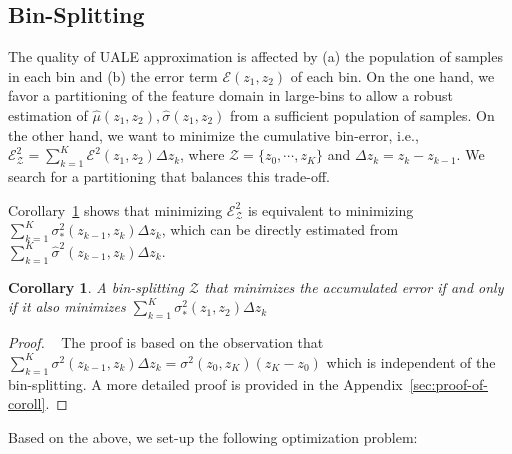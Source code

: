 \documentclass[twoside]{article}
\newtheorem{corollary}{Corollary}[theorem]
\begin{document}
\subsection{Bin-Splitting}
\label{sec:bin-spliting}

The quality of UALE approximation is affected by (a) the population of
samples in each bin and (b) the error term \(\mathcal{E}(z_1, z_2)\)
of each bin. On the one hand, we favor a partitioning of the feature
domain in large-bins to allow a robust estimation of
\(\hat{\mu}(z_1, z_2), \hat{\sigma}(z_1, z_2)\) from a sufficient
population of samples. On the other hand, we want to minimize the
cumulative bin-error, i.e.,
\( \mathcal{E}^2_{\mathcal{Z}} = \sum_{k=1}^K\mathcal{E}^2(z_1, z_2)
\Delta z_k\), where \(\mathcal{Z} = \{z_0, \cdots, z_K\}\) and
\(\Delta z_k = z_k - z_{k-1}\). We search for a partitioning that
balances this trade-off.

Corollary~\ref{sec:coroll} shows that minimizing
\( \mathcal{E}^2_{\mathcal{Z}} \) is equivalent to minimizing
\(\sum_{k=1}^K \sigma_*^2(z_{k-1}, z_k)\Delta z_k\), which can be directly
estimated from \(\sum_{k=1}^K \hat{\sigma}^2(z_{k-1}, z_k) \Delta z_k \).

\begin{corollary}
  \label{sec:coroll}
  A bin-splitting \(\mathcal{Z}\) that minimizes the accumulated error
  if and only if it also minimizes
  \(\sum_{k=1}^K\sigma_*^2(z_1, z_2) \Delta z_k \)
\end{corollary}

\begin{proof}
  ~\label{sec:coroll-1} The proof is based on the observation that
  \(\sum_{k=1}^K \sigma^2(z_{k-1}, z_k) \Delta z_k = \sigma^2(z_0,
  z_K) (z_K - z_0)\) which is independent of the bin-splitting. A more
  detailed proof is provided in the Appendix~\ref{sec:proof-of-coroll}.
 \end{proof}

Based on the above, we set-up the following optimization problem:
\end{document}
